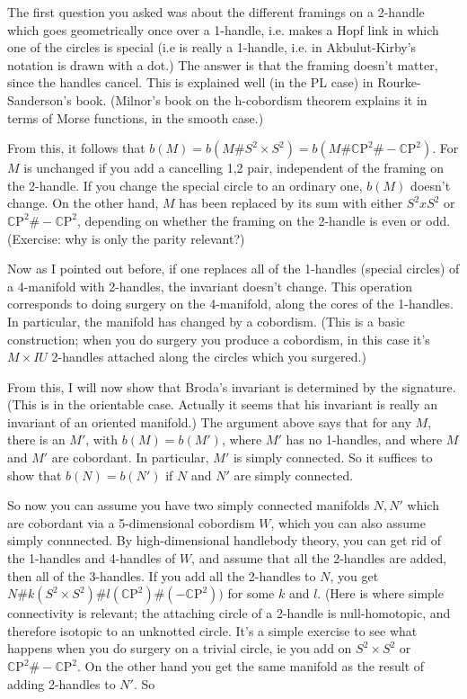The first question you asked was about the different framings on a 2-handle which goes geometrically once over a 1-handle, i.e. makes a Hopf link in which one of the circles is special (i.e is really a 1-handle, i.e. in Akbulut-Kirby's notation is drawn with a dot.) The answer is that the framing doesn't matter, since the handles cancel. This is explained well (in the PL case) in Rourke-Sanderson's book. (Milnor's book on the h-cobordism theorem explains it in terms of Morse functions, in the smooth case.)

From this, it follows that $b(M) = b(M \# S^2 \times S^2) = b(M \#  \mathbb{C}\mathrm{P}^2 \# -\mathbb{C}\mathrm{P}^2)$. For $M$ is unchanged if you add a cancelling 1,2 pair, independent of the framing on the 2-handle. If you change the special circle to an ordinary one, $b(M)$ doesn't change. On the other hand, $M$ has been replaced by its sum with either $S^2 x S^2$ or $ \mathbb{C}\mathrm{P}^2 \# - \mathbb{C}\mathrm{P}^2$, depending on whether the framing on the 2-handle is even or odd. (Exercise: why is only the parity relevant?)

Now as I pointed out before, if one replaces all of the 1-handles (special circles) of a 4-manifold with 2-handles, the invariant doesn't change. This operation corresponds to doing surgery on the 4-manifold, along the cores of the 1-handles. In particular, the manifold has changed by a cobordism. (This is a basic construction; when you do surgery you produce a cobordism, in this case it's $M \times I U$ 2-handles attached along the circles which you surgered.)

From this, I will now show that Broda's invariant is determined by the signature. (This is in the orientable case. Actually it seems that his invariant is really an invariant of an oriented manifold.) The argument above says that for any $M$, there is an $M'$, with $b(M) = b(M')$, where $M'$ has no 1-handles, and where $M$ and $M'$ are cobordant. In particular, $M'$ is simply connected. So it suffices to show that $b(N) = b(N')$ if $N$ and $N'$ are simply connected.

So now you can assume you have two simply connected manifolds $N,N'$ which are cobordant via a 5-dimensional cobordism $W$, which you can also assume simply connnected. By high-dimensional handlebody theory, you can get rid of the 1-handles and 4-handles of $W$, and assume that all the 2-handles are added, then all of the 3-handles. If you add all the 2-handles to $N$, you get $N \# k(S^2 \times S^2) \# l(\mathbb{C}\mathrm{P}^2) \# (-\mathbb{C}\mathrm{P}^2))$ for some $k$ and $l$. (Here is where simple connectivity is relevant; the attaching circle of a 2-handle is null-homotopic, and therefore isotopic to an unknotted circle. It's a simple exercise to see what happens when you do surgery on a trivial circle, ie you add on $S^2 \times S^2$ or $ \mathbb{C}\mathrm{P}^2 \# -\mathbb{C}\mathrm{P}^2$. On the other hand you get the same manifold as the result of adding 2-handles to $N'$. So


